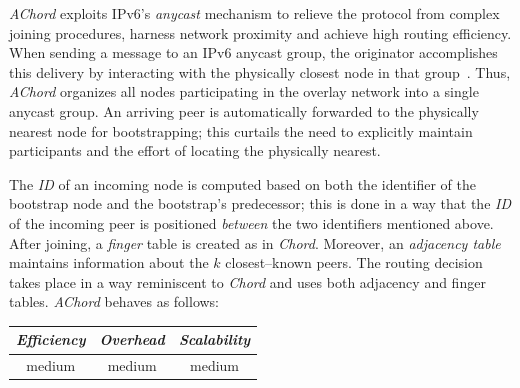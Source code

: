 \emph{AChord} \cite{DK2006} exploits IPv6's \emph{anycast} mechanism to
relieve the protocol from complex joining procedures,
harness network proximity and achieve high routing efficiency. 
When sending a message to an IPv6 anycast group, 
the originator accomplishes this delivery by interacting with
the physically closest node in that group~\cite{M2002}.
Thus, \emph{AChord} organizes all nodes participating
in the overlay network into a single anycast group. 
An arriving peer is automatically forwarded to the physically 
nearest node for
bootstrapping; this curtails the need to explicitly maintain participants
and the effort of locating the physically nearest. 

The \emph{ID} of an incoming node is computed based on 
both the identifier of the bootstrap node 
and the bootstrap's predecessor;
this is  done in a way that the \emph{ID} of the 
incoming peer is positioned \emph{between} the two identifiers mentioned above. 
After joining, a \emph{finger} table is created as in \emph{Chord}. 
Moreover, an \emph{adjacency table} maintains 
information about the $k$ closest--known peers. 
The routing decision takes place in a way reminiscent to \emph{Chord}
and uses both adjacency and finger tables.
\emph{AChord} behaves as follows:
\begin{center}
{\footnotesize
\begin{tabular}{ccc}
\emph{Efficiency} & \emph{Overhead} & \emph{Scalability} \\
\hline
medium &
medium &
medium
\end{tabular}
}
\end{center}

